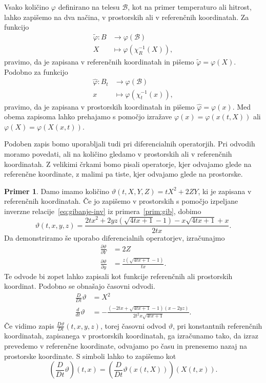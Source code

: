 \documentclass[12pt,a4paper,twoside]{article}
\theoremstyle{definition} %
\newtheorem{primer}[definicija]{Primer}
\theoremstyle{plain} %
\numberwithin{equation}{section}
\newcommand{\B}{\mathcal{B}}
\renewcommand{\phi}{\varphi}
\newcommand{\dpar}[2]{\ensuremath{\frac{\partial #1}{\partial #2}}}
\newcommand{\dd}[2]{\ensuremath{\frac{d #1}{d #2}}}
\newcommand{\ddt}[1]{\dd{#1}{t}}
\newcommand{\DD}[2]{\ensuremath{\frac{D #1}{D #2}}}
\newcommand{\DDt}[1]{\DD{#1}{t}}
\newcommand{\vX}{X}
\newcommand{\vx}{x}
\begin{document}
Vsako količino $\phi$ definirano na telesu $\B$, kot na primer temperaturo ali
hitrost, lahko zapišemo na dva načina, v
prostorskih ali v referenčnih koordinatah. Za funkcijo
\begin{align}
  \tilde \phi\colon B &\to \phi(\B) \nonumber \\
  \vX&\mapsto \phi(\chi_R^{-1}(\vX)), \label{eq:toref}
\end{align}
pravimo, da je zapisana v referenčnih koordinatah in pišemo $\tilde\phi =
\phi(\vX)$.
Podobno za funkcijo
\begin{align}
  \hat \phi\colon B_t &\to \phi(\B) \nonumber \\
  \vx&\mapsto \phi(\chi_t^{-1}(\vx)), \label{eq:topro}
\end{align}
pravimo, da je zapisana v prostorskih koordinatah in pišemo $\hat\phi = \phi(\vx)$.
Med obema zapisoma lahko prehajamo s pomočjo izražave $\phi(\vx) = \phi(\vx(t, \vX))$
ali $\phi(\vX) = \phi(\vX(\vx, t))$.

Podoben zapis bomo uporabljali tudi pri diferencialnih operatorjih. Pri odvodih
moramo povedati, ali na količino gledamo v prostorskih ali v referenčnih
koordinatah. Z velikimi črkami bomo pisali operatorje, kjer odvajamo glede na
referenčne koordinate, z malimi pa tiste, kjer odvajamo glede na prostorske.

\begin{primer}
  Damo imamo količino $\vartheta(t, X, Y, Z) = tX^2 + 2 ZY$, ki je zapisana v
  referenčnih koordinatah. Če jo zapišemo v prostorskih s pomočjo izpeljane
  inverzne relacije~\eqref{eq:gibanje-inv} iz primera~\ref{prim:gib}, dobimo
  \[
    \vartheta(t, x, y, z) = \frac{2 t x^2+2 y z \left(\sqrt{4 t x+1}-1\right)-x
    \sqrt{4 t x+1}+x}{2 t x}.
  \]
  Da demonstriramo še uporabo diferencialnih operatorjev, izračunajmo
  \begin{align*}
    \dpar{\vartheta}{Y} &= 2Z  \\
    \dpar{\vartheta}{y} &= \frac{z \left(\sqrt{4 t x+1}-1\right)}{t x}.
  \end{align*}
  Te odvode bi zopet lahko zapisali kot funkcije referenčnih ali prostorskih
  koordinat. Podobno se obnašajo časovni odvodi.
  \begin{align*}
    \DDt{} \vartheta &= X^2 \\
    \ddt{} \vartheta &=  -\frac{\left(-2 t x+\sqrt{4 t x+1}-1\right) (x-2 y
    z)}{2 t^2 x \sqrt{4 t x+1}}.
  \end{align*}
  Če vidimo zapis $\DDt \vartheta(t, x, y, z)$, torej časovni odvod $\vartheta$, pri
  konstantnih referenčnih koordinatah, zapisanega v prostorskih
  koordinatah, ga izračunamo tako, da izraz prevedemo v referenčne koordinate,
  odvajamo po času in prenesemo nazaj na prostorske koordinate. S simboli
  lahko to zapišemo kot
  \[
    \left(\DDt{} \vartheta\right)(t, \vx) = \left( \DDt{}\vartheta(\vx(t, \vX))
    \right)(\vX(t, \vx)).
  \]
\end{primer}
\end{document}
